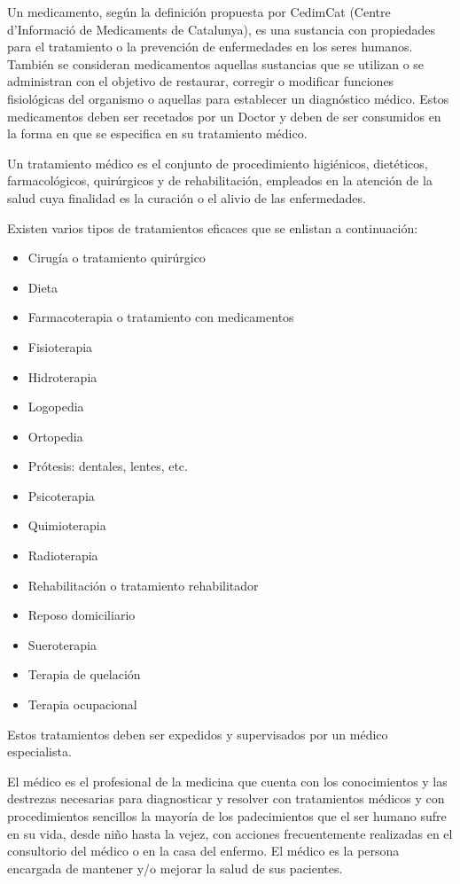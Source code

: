 Un medicamento, según la definición propuesta por CedimCat (Centre d'Informació de Medicaments de Catalunya)\cite{Referencia5}, es una sustancia con propiedades para el tratamiento o la prevención de enfermedades en los seres humanos. También se consideran medicamentos aquellas sustancias que se utilizan o se administran con el objetivo de restaurar, corregir o modificar funciones fisiológicas del organismo o aquellas para establecer un diagnóstico médico. Estos medicamentos deben ser recetados por un Doctor y deben de ser consumidos en la forma en que se especifica en su tratamiento médico.

Un tratamiento médico es el conjunto de procedimiento higiénicos, dietéticos, farmacológicos, quirúrgicos y de rehabilitación, empleados en la atención de la salud\cite{Referencia6} cuya finalidad es la curación o el alivio de las enfermedades.

Existen varios tipos de tratamientos eficaces que se enlistan a continuación\cite{Referencia7}:
\begin{itemize}
	\item Cirugía o tratamiento quirúrgico
	\item Dieta
	\item Farmacoterapia o tratamiento con medicamentos
	\item Fisioterapia
	\item Hidroterapia
	\item Logopedia
	\item Ortopedia
	\item Prótesis: dentales, lentes, etc.
	\item Psicoterapia
	\item Quimioterapia
	\item Radioterapia
	\item Rehabilitación o tratamiento rehabilitador
	\item Reposo domiciliario
	\item Sueroterapia
	\item Terapia de quelación
	\item Terapia ocupacional
\end{itemize}

Estos tratamientos deben ser expedidos y supervisados por un médico especialista.

El médico es el profesional de la medicina que cuenta con los conocimientos y las destrezas necesarias para diagnosticar y resolver con tratamientos médicos y con procedimientos sencillos la mayoría de los padecimientos que el ser humano sufre en su vida, desde niño hasta la vejez, con acciones frecuentemente realizadas en el consultorio del médico o en la casa del enfermo\cite{Referencia8}. El médico es la persona encargada de mantener y/o mejorar la salud de sus pacientes.

